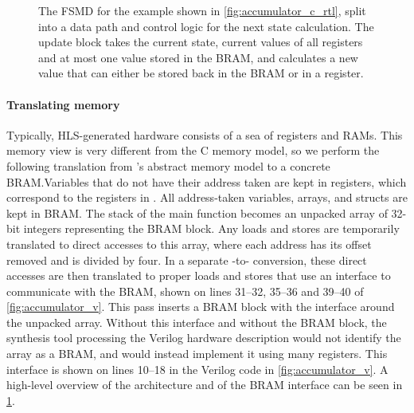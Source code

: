 \begin{figure}
\caption{The FSMD for the example shown in \cref{fig:accumulator_c_rtl}, split
  into a data path and control logic for the next state calculation.  The update
  block takes the current state, current values of all registers and at most one
  value stored in the \gls{BRAM}, and calculates a new value that can either be
  stored back in the \gls{BRAM} or in a
  register.}\label{fig:accumulator_diagram}
\end{figure}

\paragraph{Translating memory}

Typically, HLS-generated hardware consists of a sea of registers and RAMs.  This
memory view is very different from the C memory model, so we perform the
following translation from \compcert{}'s abstract memory model to a concrete
\gls{BRAM}.\@ Variables that do not have their address taken are kept in
registers, which correspond to the registers in \rtl{}.  All address-taken
variables, arrays, and structs are kept in \gls{BRAM}.  The stack of the main
function becomes an unpacked array of 32-bit integers representing the
\gls{BRAM} block.  Any loads and stores are temporarily translated to direct
accesses to this array, where each address has its offset removed and is divided
by four.  In a separate \htl{}-to-\htl{} conversion, these direct accesses are
then translated to proper loads and stores that use an interface to communicate
with the \gls{BRAM}, shown on lines 31--32, 35--36 and 39--40 of
\cref{fig:accumulator_v}.  This pass inserts a \gls{BRAM} block with the
interface around the unpacked array.  Without this interface and without the
\gls{BRAM} block, the synthesis tool processing the Verilog hardware description
would not identify the array as a \gls{BRAM}, and would instead implement it
using many registers.  This interface is shown on lines 10--18 in the Verilog
code in \cref{fig:accumulator_v}.  A high-level overview of the architecture and
of the \gls{BRAM} interface can be seen in \cref{fig:accumulator_diagram}.

